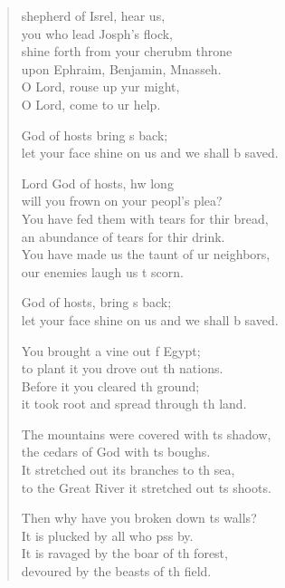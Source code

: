 \settowidth{\versewidth}{let your face shine on us and we shall be saved.}
\begin{verse}%
  \begin{patverse}
 shepherd of Isrel, hear us,\Med\\
you who lead Josph’s flock,\\
shine forth from your cherub\pointup{\i}m throne\Med\\
upon Ephraim, Benjamin, Mnasseh.\\
O Lord, rouse up yur might,\Med\\
O Lord, come to ur help.

God of hosts bring s back;\Med\\
let your face shine on us and we shall b saved.

Lord God of hosts, hw long\Med\\
will you frown on your peopl’s plea?\\
You have fed them with tears for thir bread,\Med\\
an abundance of tears for thir drink.\\
You have made us the taunt of ur neighbors,\Med\\
our enemies laugh us t scorn.

God of hosts, bring s back;\Med\\
let your face shine on us and we shall b saved.

You brought a vine out f Egypt;\Med\\
to plant it you drove out th nations.\\
Before it you cleared th ground;\Med\\
it took root and spread through th land.

The mountains were covered with \pointup{\i}ts shadow,\Med\\
the cedars of God with \pointup{\i}ts boughs.\\
It stretched out its branches to th sea,\Med\\
to the Great River it stretched out \pointup{\i}ts shoots.

Then why have you broken down \pointup{\i}ts walls?\Med\\
It is plucked by all who pss by.\\
It is ravaged by the boar of th forest,\Med\\
devoured by the beasts of th field.


\end{patverse}
\end{verse}
